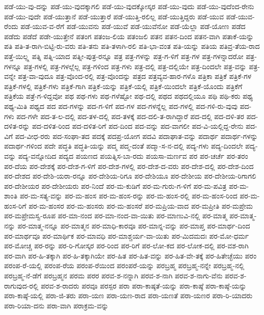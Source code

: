 {ಪಡೆ-ಯು-ವು-ದನ್ನು
ಪಡೆ-ಯು-ವುದಕ್ಕಾಗಲಿ
ಪಡೆ-ಯು-ವುದಕ್ಕೋಸ್ಕರ
ಪಡೆ-ಯು-ವುದು
ಪಡೆ-ಯು-ವುದೆಂದ-ರೇನು
ಪಡೆ-ಯು-ವುದೇ
ಪಡೆ-ಯುತ್ತಾನೆ
ಪಡೆ-ಯುತ್ತಾರೆ
ಪಡೆ-ಯುತ್ತಿ-ರಲಿಲ್ಲ
ಪಡೆ-ಯುತ್ತಿದ್ದರು
ಪಡೆ-ಯುವ
ಪಡೆ-ಯುವ-ರೆಂದು
ಪಡೆ-ಯುವ-ವ-ರೆಗೆ
ಪಡೆ-ಯುವನು
ಪಡೆ-ಯುವೆ
ಪಡೆ-ಯುವೆನೋ
ಪಡೆ-ಯೆಲ್ಲಾ
ಪಡೆ-ಯೋಣ
ಪಡೆದ
ಪಡೆದು
ಪಡೆದೆ
ಪಡೇ-ಯುತ್ತೇನೆ
ಪತಂಗ
ಪತಂಜ-ಲಿಯ
ಪತಂಜಲಿ
ಪತನ
ಪತನ-ದಿಂದ
ಪತನ-ವಾಗಿ
ಪತಾಕೆ-ಯನ್ನು
ಪತಿ
ಪತಿ-ತ-ರಾಗಿ-ಬಿಟ್ಟಿ-ರು-ವರು
ಪತಿ-ತನು
ಪತಿ-ತಳಾಗಿ-ರಲಿ
ಪತಿ-ಭಾ-ವಂತ
ಪತಿ-ಯನ್ನು
ಪತಿಯ
ಪತಿವ್ರ-ತೆಯ-ರಾದ
ಪತ್ತೆ-ಯಿಲ್ಲ್ಲ
ಪತ್ನಿ
ಪತ್ನಿ-ಯಾದ
ಪತ್ನೀ-ಪುತ್ರ-ರನ್ನೂ
ಪತ್ರ
ಪತ್ರ-ಗಳನ್ನು
ಪತ್ರ-ಗ-ಳಿಗೆ
ಪತ್ರ-ಗಳ
ಪತ್ರ-ಗಳನ್ನಾದರೋ
ಪತ್ರ-ಗಳನ್ನೂ
ಪತ್ರ-ಗಳಲ್ಲಿ
ಪತ್ರ-ಗಳಲ್ಲೆಲ್ಲ
ಪತ್ರ-ಗಳಿಂದ
ಪತ್ರ-ಗಳು
ಪತ್ರ-ದಲ್ಲಿ
ಪತ್ರ-ದಲ್ಲಿಯೇ
ಪತ್ರ-ದಿಂದಲೇ
ಪತ್ರ-ವನ್ನು
ಪತ್ರ-ವನ್ನೇ
ಪತ್ರ-ವಾ-ವುದೂ
ಪತ್ರ-ವೊಂದ-ರಲ್ಲಿ
ಪತ್ರ-ವೊಂದನ್ನು
ಪತ್ರದ
ಪತ್ರವ್ಯವ-ಹಾರ-ಗಳೊ
ಪತ್ರಿಕಾ
ಪತ್ರಿಕೆ
ಪತ್ರಿಕೆ-ಗಳ
ಪತ್ರಿಕೆ-ಗಳಲ್ಲಿ
ಪತ್ರಿಕೆ-ಗಳು
ಪತ್ರಿಕೆ-ಗಾಗಿ
ಪತ್ರಿಕೆ-ಯನ್ನು
ಪತ್ರಿಕೆ-ಯಲ್ಲಿ
ಪತ್ರಿಕೆ-ಯಿಂದಲೇ
ಪತ್ರಿಕೆ-ಯೊಂದು
ಪತ್ರಿಕೆಗೆ
ಪತ್ರಿಕೆಯ
ಪತ್ರೆ-ಗ-ಳಿದ್ದವೋ
ಪಥ
ಪಥ-ಗಳು
ಪಥ-ಗಳೆಷ್ಟೋ
ಪಥ-ದಲ್ಲಿ
ಪಥದ
ಪಥದಲ್ಲಿಯೂ
ಪಥಿ
ಪಥಿ-ಕರು
ಪಥ್ಯ
ಪಥ್ಯ-ಮಿತಿ
ಪಥ್ಯದ
ಪದ
ಪದ-ಗಳನ್ನು
ಪದ-ಗ-ಳಿಗೆ
ಪದ-ಗಳ
ಪದ-ಗಳನ್ನೆಲ್ಲ
ಪದ-ಗಳಲ್ಲಿ
ಪದ-ಗಳಿ-ರು-ವುವು
ಪದ-ಗಳು
ಪದ-ಗಳೇ
ಪದ-ತ-ಲ-ದಲ್ಲಿ
ಪದ-ತಳ-ದಲ್ಲಿ
ಪದ-ತಳಕ್ಕೆ
ಪದ-ದಲಿ-ತ-ರಾಗಿದ್ದಾರೆ
ಪದ-ದಲ್ಲಿ
ಪದ-ದಳಿ-ತರ
ಪದ-ದಳಿತ-ರನ್ನು
ಪದ-ದಳಿತ-ರಿಂದ
ಪದ-ದಳಿತ-ರಿಗೆ
ಪದ-ದಿಂದ
ಪದ-ವನ್ನು
ಪದ-ವಾಗಲೀ
ಪದ-ವಿ-ಯಲ್ಲಿದ್ದ-ರೇನು
ಪದ-ವಿಗೆ
ಪದ-ವೀಧ-ರರು
ಪದ-ಸಂಘಾ-ತದ
ಪದಕ್ಕೆ
ಪದಪ್ರ-ಯೋಗ
ಪದವಿ
ಪದಾಘಾತ-ವನ್ನು
ಪದಾರ್ಥ
ಪದಾರ್ಥ-ಗಳನ್ನು
ಪದಾರ್ಥ-ಗಳಿಂದ
ಪದೇ
ಪದ್ಧತಿ
ಪದ್ಧತಿ-ಯನ್ನು
ಪದ್ಮ
ಪದ್ಮ-ದಂತೆ
ಪದ್ಮಾ-ಸ-ನ-ದಲ್ಲಿ
ಪದ್ಯ-ಗಳು
ಪದ್ಯ-ದಿಂದಲೇ
ಪದ್ಯ-ವನ್ನು
ಪದ್ಯ-ವನ್ನೋದಿದ
ಪದ್ಯದ
ಪಯಣದ
ಪಯತ್ನಿಸ-ಬಾ-ರದು
ಪಯಸಾ-ಮರ್ಣವ
ಪರ
ಪರ-ಚರ್ಚೆ
ಪರ-ತರಂ
ಪರ-ದೆಯ
ಪರ-ದೇಶಕ್ಕೆ
ಪರ-ದೇಶ-ಗ-ಳಿಗೆ
ಪರ-ದೇಶ-ಗಳಲ್ಲಿ
ಪರ-ದೇಶ-ದ-ವರು
ಪರ-ದೇಶ-ದಲ್ಲಿ
ಪರ-ದೇಶ-ದಿಂದ
ಪರ-ದೇಶದ
ಪರ-ದೇಶಿ-ಯರಾ-ರನ್ನೂ
ಪರ-ದೇಶಿಯ-ರಿಗೂ
ಪರ-ದೇಶಿಯೂ
ಪರ-ದೇಶೀಯ
ಪರ-ದೇಶೀಯ-ರಿಗಾಗಲಿ
ಪರ-ದೇಶೀಯರ
ಪರ-ದೇಶೀಯರು
ಪರ-ನಿಂದೆ
ಪರ-ಮ-ಕುಡಿಗೆ
ಪರ-ಮ-ಗುರು-ಗ-ಳಿಗೆ
ಪರ-ಮ-ಪವಿತ್ರ
ಪರ-ಮ-ಶಾಂತಿ
ಪರ-ಮ-ಸತ್ಯ-ವನ್ನು
ಪರ-ಮ-ಹಂಸ
ಪರ-ಮ-ಹಂಸ-ರನ್ನು
ಪರ-ಮ-ಹಂಸ-ರಲ್ಲಿ
ಪರ-ಮ-ಹಂಸ-ರಿಂದ
ಪರ-ಮ-ಹಂಸ-ರಿಗೆ
ಪರ-ಮ-ಹಂಸರ
ಪರ-ಮ-ಹಂಸರು
ಪರ-ಮ-ಹಂಸರೆ
ಪರ-ಮಪ್ರಿಯ-ವಾದ
ಪರ-ಮಪ್ರೀತಿ
ಪರ-ಮಪ್ರೇಮ
ಪರ-ಮಪ್ರೇಮಸ್ವ-ರೂಪ
ಪರ-ಮಾ-ನಂದ
ಪರ-ಮಾ-ನಂದ-ವಾ-ಯಿತು
ಪರ-ಮಾಣುವಿ-ನಲ್ಲಿ
ಪರ-ಮಾತ್ಮ
ಪರ-ಮಾತ್ಮ-ನನ್ನು
ಪರ-ಮಾತ್ಮ-ನನ್ನೂ
ಪರ-ಮಾತ್ಮನ
ಪರ-ಮಾಧಿ-ಕಾರವೂ
ಪರ-ಮಾನ್ನ-ವನ್ನು
ಪರ-ಮಾಪ್ತ
ಪರ-ಮಾರ್ಥ-ದಿಂದ
ಪರ-ಮಾರ್ಥವೂ
ಪರ-ಮಾರ್ಥಿಕ
ಪರ-ಮಾವಧಿ
ಪರ-ಮಾಶ್ಚರ್ಯ-ವಾ-ಯಿತು
ಪರ-ಮಿದಮದಃ
ಪರ-ಮೋ-ಧರ್ಮ
ಪರ-ಮೋಚ್ಚ
ಪರ-ರನ್ನು
ಪರ-ರಿ-ಗೋಸ್ಕರ
ಪರ-ರಿಂದ
ಪರ-ರಿಗೆ
ಪರ-ಲೋ-ಕದ
ಪರ-ಲೋಕ-ದಲ್ಲಿ
ಪರ-ವಶ-ರಾಗಿ
ಪರ-ವಾಗಿ
ಪರ-ಹಿ-ತಕ್ಕಾಗಿ
ಪರ-ಹಿ-ತಕ್ಕಾಗಿಯೇ
ಪರ-ಹಿತ
ಪರ-ಹಿತ-ವನ್ನು
ಪರ-ಹಿತ-ವೇ-ತಕ್ಕೆ
ಪರ-ಹಿತೇಚ್ಛೆಯು
ಪರಂ
ಪರಂಪ-ರೆ-ಯಲ್ಲಿ
ಪರಂಪ-ರೆಯ
ಪರಂಪ-ರೆಯಿಂದ
ಪರಂಪರೆ-ಯನ್ನು
ಪರಬ್ರಹ್ಮ
ಪರಬ್ರಹ್ಮ-ನನ್ನೇ
ಪರಬ್ರಹ್ಮ-ನಲ್ಲಿ
ಪರಬ್ರಹ್ಮ-ನೆ-ಡೆಗೆ
ಪರಬ್ರಹ್ಮನ
ಪರಮ
ಪರರ
ಪರವ-ಶ-ನನ್ನಾಗಿ
ಪರವ-ಶ-ನಾಗಿ
ಪರವ-ಶ-ನಾಗು-ವೆನು
ಪರವ-ಶ-ರಾಗುವುದ-ರಲ್ಲಿ
ಪರವ-ಶ-ರಾದರು
ಪರವೂ
ಪರಸ್ಪರ
ಪರಾ
ಪರಾ-ಕಾಷ್ಠತೆ-ಯನ್ನು
ಪರಾ-ಕಾಷ್ಠೆ
ಪರಾ-ಕಾಷ್ಠೆ-ಯನ್ನು
ಪರಾ-ಕಾಷ್ಠೆ-ಯಲ್ಲಿ
ಪರಾ-ಜಿ-ತರು
ಪರಾ-ಯಣ
ಪರಾ-ಯಣ-ರಾದ
ಪರಾ-ಯಣತೆ
ಪರಾ-ಯಣರ
ಪರಾ-ರಿ-ಯಾದರು
ಪರಾ-ರಿಯಾ-ದನು
ಪರಾ-ವಾಗಿ
ಪರಾಕ್ರಮ-ವನ್ನು
}
